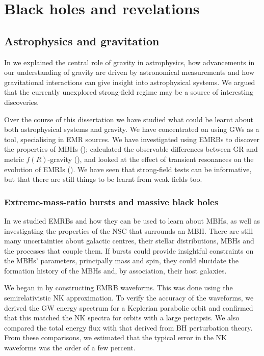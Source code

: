 \chapter{Black holes and revelations}\label{ch:All-good-things}

\section{Astrophysics and gravitation}

In  we explained the central role of gravity in astrophysics, how advancements in our understanding of gravity are driven by astronomical measurements and how gravitational interactions can give insight into astrophysical systems. We argued that the currently unexplored strong-field regime may be a source of interesting discoveries.

Over the course of this dissertation we have studied what could be learnt about both astrophysical systems and gravity. We have concentrated on using GWs as a tool, specialising in EMR sources. We have investigated using EMRBs to discover the properties of MBHs (); calculated the observable differences between GR and metric $f(R)$-gravity (), and looked at the effect of transient resonances on the evolution of EMRIs (). We have seen that strong-field tests can be informative, but that there are still things to be learnt from weak fields too.

\subsection{Extreme-mass-ratio bursts and massive black holes}\label{sec:Review-EMRBs}

In  we studied EMRBs and how they can be used to learn about MBHs, as well as investigating the properties of the NSC that surrounds an MBH. There are still many uncertainties about galactic centres, their stellar distributions, MBHs and the processes that couple them. If bursts could provide insightful constraints on the MBHs' parameters, principally mass and spin, they could elucidate the formation history of the MBHs and, by association, their host galaxies.

We began in  by constructing EMRB waveforms. This was done using the semirelativistic NK approximation. To verify the accuracy of the waveforms, we derived the GW energy spectrum for a Keplerian parabolic orbit and confirmed that this matched the NK spectra for orbits with a large periapsis. We also compared the total energy flux with that derived from BH perturbation theory. From these comparisons, we estimated that the typical error in the NK waveforms was the order of a few percent.

